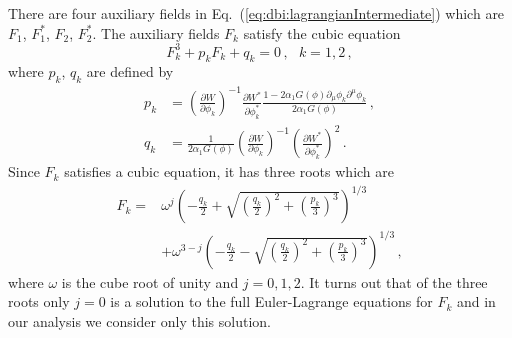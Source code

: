 \documentclass[11pt]{article}
\begin{document}
There are four auxiliary fields in Eq.~(\ref{eq:dbi:lagrangianIntermediate}) which are $F_1$, $F^*_1$, $F_2$, $F^*_2$.
The auxiliary fields $F_k$ satisfy the cubic equation
\begin{equation}
  F_k^3 + p_k F_k + q_k = 0\,,
  ~~~ k = 1, 2\,,
\end{equation}
where $p_k$, $q_k$ are defined by
\begin{equation} \label{eq:DBI:pq}
  \begin{aligned}
    p_k &=
      \left(\frac{\partial W}{\partial \phi_k}\right)^{-1}
      \frac{\partial W^*}{\partial \phi^*_k}
      \frac
        {1 - 2 \alpha_1 G\left(\phi\right) \partial_\mu \phi_k \partial^\mu \phi_k}
        {2 \alpha_1 G\left(\phi\right)}\,,\\
    q_k &=
      \frac{1}{2 \alpha_1 G\left(\phi\right)}
      \left(\frac{\partial W}{\partial \phi_k}\right)^{-1}
      \left(\frac{\partial W^*}{\partial \phi^*_k}\right)^2\,.
  \end{aligned}
\end{equation}
Since $F_k$ satisfies a cubic equation, it has three roots which are
\begin{equation} \label{eq:DBI:F}
  \begin{aligned}
    F_k = &\omega^j \left(
      - \frac{q_k}{2}
      + \sqrt{\left(\frac{q_k}{2}\right)^2 + \left(\frac{p_k}{3}\right)^3}\right)^{1 / 3}\\
    & + \omega^{3 - j} \left(
      - \frac{q_k}{2}
      - \sqrt{\left(\frac{q_k}{2}\right)^2 + \left(\frac{p_k}{3}\right)^3}\right)^{1 / 3}\,,
  \end{aligned}
\end{equation}
where $\omega$ is the cube root of unity and $j = 0, 1, 2$.
It turns out that of the three roots only $j = 0$ is a solution to the full Euler-Lagrange equations for $F_k$ and in our analysis we consider only this solution.
\end{document}
